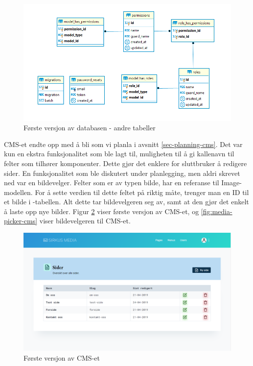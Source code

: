 \begin{figure}[H]
    \centering
    \includegraphics[width=\textwidth]{bjornar/db-endelig-annet.png}
    \caption{Første versjon av databasen - andre tabeller}
    \label{fig:first-version-db-other}
\end{figure}

CMS-et endte opp med å bli som vi planla i avsnitt \ref{sec-planning-cms}. Det var kun en ekstra funksjonalitet som ble lagt til, muligheten til å gi kallenavn til felter som tilhører komponenter. Dette gjør det enklere for sluttbruker å redigere sider. En funksjonalitet som ble diskutert under planlegging, men aldri skrevet ned var en bildevelger. Felter som er av typen bilde, har en referanse til Image-modellen. For å sette verdien til dette feltet på riktig måte, trenger man en ID til et bilde i -tabellen. Alt dette tar bildevelgeren seg av, samt at den gjør det enkelt å laste opp nye bilder. Figur \ref{fig:first-version-cms} viser første versjon av CMS-et, og \ref{fig:media-picker-cms} viser bildevelgeren til CMS-et.

\begin{figure}[H]
    \centering
    \includegraphics[width=\textwidth]{first-version-cms.png}
    \caption{Første versjon av CMS-et}
    \label{fig:first-version-cms}
\end{figure}

